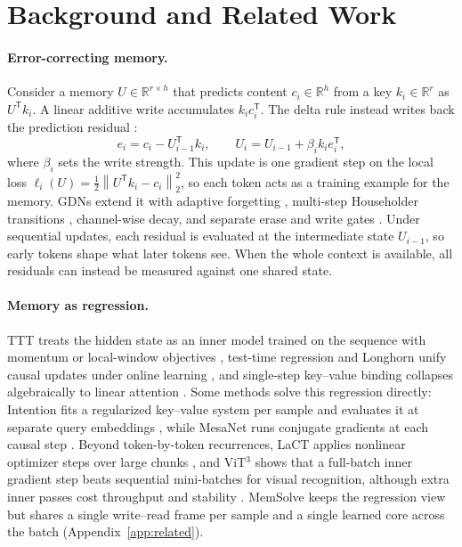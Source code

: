 \documentclass[10pt,twocolumn]{article}
\newcommand{\R}{\mathbb{R}}
\newcommand{\T}{\mathsf{T}}
\newcommand{\norm}[1]{\left\lVert #1 \right\rVert}
\begin{document}
\section{Background and Related Work}
\label{sec:background}

\paragraph{Error-correcting memory.}
Consider a memory $U\in\R^{r\times h}$ that predicts content $c_i\in\R^h$ from
a key $k_i\in\R^r$ as $U^\T k_i$.
A linear additive write accumulates $k_ic_i^\T$.
The delta rule instead writes back the prediction residual
\cite{schlag2021fastweights,yang2025deltanet}:
\begin{equation}
 e_i=c_i-U_{i-1}^\T k_i,\qquad U_i=U_{i-1}+\beta_i k_i e_i^\T,
 \label{eq:delta-background}
\end{equation}
where $\beta_i$ sets the write strength.
This update is one gradient step on the local loss
$\ell_i(U)=\tfrac12\norm{U^\T k_i-c_i}_2^2$, so each token acts as a training
example for the memory.
GDNs extend it with adaptive forgetting \cite{yang2025gdn}, multi-step
Householder transitions \cite{siems2025deltaproduct}, channel-wise decay, and
separate erase and write gates \cite{kimi2025linear,hatamizadeh2026gdn2}.
Under sequential updates, each residual is evaluated at the intermediate state
$U_{i-1}$, so early tokens shape what later tokens see.
When the whole context is available, all residuals can instead be measured
against one shared state.

\paragraph{Memory as regression.}
TTT treats the hidden state as an inner model trained on the sequence with
momentum or local-window objectives
\cite{sun2025ttt,behrouz2025titans,behrouz2026atlas}, test-time regression and
Longhorn unify causal updates under online learning
\cite{wang2025testtimeregression,liu2024longhorn}, and single-step key--value
binding collapses algebraically to linear attention \cite{liu2026kvbinding}.
Some methods solve this regression directly: Intention fits a regularized
key--value system per sample and evaluates it at separate query embeddings
\cite{garnelo2023intention}, while MesaNet runs conjugate gradients at each
causal step \cite{vonoswald2026mesanet}.
Beyond token-by-token recurrences, LaCT applies nonlinear optimizer steps over
large chunks \cite{zhang2026lact}, and ViT$^3$ shows that a full-batch inner
gradient step beats sequential mini-batches for visual recognition, although
extra inner passes cost throughput and stability \cite{han2026vit3}.
MemSolve keeps the regression view but shares a single write--read frame per
sample and a single learned core across the batch (Appendix~\ref{app:related}).
\end{document}
